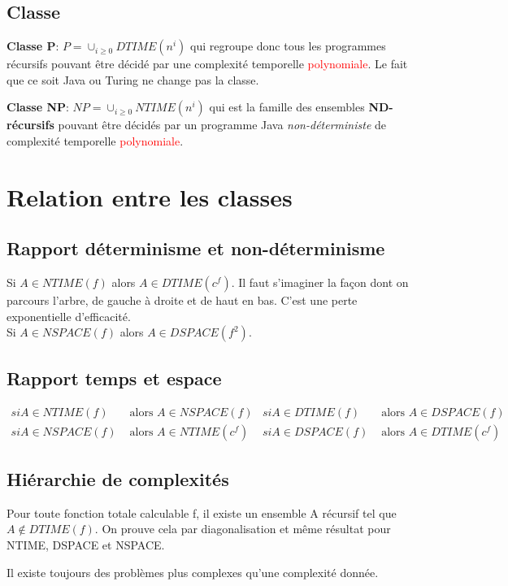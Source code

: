\documentclass{report}
\begin{document}
\subsection{Classe}
\textbf{Classe P}: $P = \cup_{i \geqslant 0} DTIME(n^i)$ qui regroupe donc tous les programmes récursifs pouvant être décidé par une complexité temporelle \textcolor{red}{polynomiale}. Le fait que ce soit Java ou Turing ne change pas la classe.\par 
\textbf{Classe NP}: $NP = \cup_{i \geqslant 0} NTIME(n^i)$ qui est la famille des ensembles \textbf{ND-récursifs} pouvant être décidés par un programme Java \textit{non-déterministe} de complexité temporelle \textcolor{red}{polynomiale}.

\section{Relation entre les classes}
\subsection{Rapport déterminisme et non-déterminisme}
Si $A \in NTIME(f)$ alors $A \in DTIME(c^f)$. Il faut s'imaginer la façon dont on parcours l'arbre, de gauche à droite et de haut en bas. C'est une perte exponentielle d'efficacité.\\
Si $A \in NSPACE(f)$ alors $A \in DSPACE(f^2)$.

\subsection{Rapport temps et espace}
\begin{align*}
si A \in NTIME(f) &\text{ alors } A \in NSPACE(f) & si A \in DTIME(f) &\text{ alors } A \in DSPACE(f)\\
si A \in NSPACE(f) &\text{ alors } A \in NTIME(c^f) & si A \in DSPACE(f) &\text{ alors } A \in DTIME(c^f)
\end{align*}

\subsection{Hiérarchie de complexités}
Pour toute fonction totale calculable f, il existe un ensemble A récursif tel que $A \notin DTIME(f)$. On prouve cela par diagonalisation et même résultat pour NTIME, DSPACE et NSPACE.\par
Il existe toujours des problèmes plus complexes qu'une complexité donnée.
\end{document}
